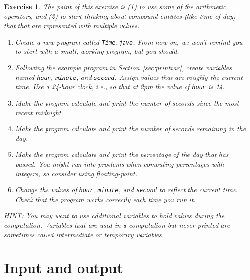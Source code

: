 \documentclass[12pt]{book}
\theoremstyle{exercise}
\newtheorem{exercise}{Exercise}[chapter]
\newcommand{\java}[1]{\lstinline{#1}} %
\begin{document}
\begin{exercise}

The point of this exercise is (1) to use some of the arithmetic operators, and (2) to start thinking about compound entities (like time of day) that that are represented with multiple values.

\begin{enumerate}

\item Create a new program called {\tt Time.java}.
From now on, we won't remind you to start with a small, working program, but you should.

\item Following the example program in Section~\ref{sec:printvar}, create variables named \java{hour}, \java{minute}, and \java{second}.
Assign values that are roughly the current time.
Use a 24-hour clock, i.e., so that at 2pm the value of \java{hour} is 14.

\item Make the program calculate and print the number of seconds since the most recent midnight.

\item Make the program calculate and print the number of seconds remaining in the day.

\item Make the program calculate and print the percentage of the day that has passed.
You might run into problems when computing percentages with integers, so consider using floating-point.

\item Change the values of \java{hour}, \java{minute}, and \java{second} to reflect the current time.
Check that the program works correctly each time you run it.

\end{enumerate}

HINT: You may want to use additional variables to hold values during the computation.
Variables that are used in a computation but never printed are sometimes called intermediate or temporary variables.

\end{exercise}


\chapter{Input and output}

\end{document}
